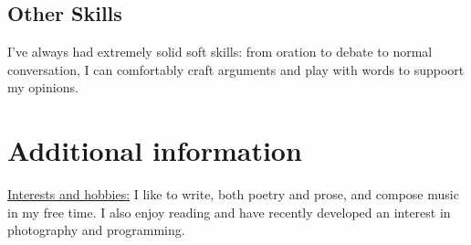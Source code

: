 \documentclass[12pt]{article}
\begin{document}
	\subsection{Other Skills}
	I've always had extremely solid soft skills: from oration to debate to normal conversation, I can comfortably craft arguments and play with words to suppoort my opinions.

\section{Additional information}
\underline{Interests and hobbies:}
I like to write, both poetry and prose, and compose music in my free
time. I also enjoy reading and have recently developed an interest in photography and programming.
\end{document}
